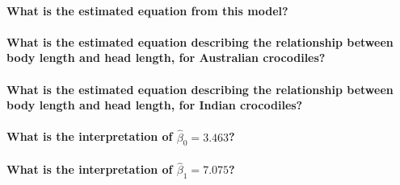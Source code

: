 \documentclass[]{article}
\let\oldparagraph\paragraph
\renewcommand{\paragraph}[1]{\oldparagraph{#1}\mbox{}}
\begin{document}
\newpage

\paragraph{What is the estimated equation from this
model?}\label{what-is-the-estimated-equation-from-this-model}

\vspace{2.5cm}

\paragraph{What is the estimated equation describing the relationship
between body length and head length, for Australian
crocodiles?}\label{what-is-the-estimated-equation-describing-the-relationship-between-body-length-and-head-length-for-australian-crocodiles}

\vspace{2.5cm}

\paragraph{What is the estimated equation describing the relationship
between body length and head length, for Indian
crocodiles?}\label{what-is-the-estimated-equation-describing-the-relationship-between-body-length-and-head-length-for-indian-crocodiles}

\vspace{2.5cm}

\paragraph{\texorpdfstring{What is the interpretation of
\(\widehat{\beta}_0 = 3.463\)?}{What is the interpretation of \textbackslash{}widehat\{\textbackslash{}beta\}\_0 = 3.463?}}\label{what-is-the-interpretation-of-widehatbeta_0-3.463}

\vspace{2.5cm}

\paragraph{\texorpdfstring{What is the interpretation of
\(\widehat{\beta}_1 = 7.075\)?}{What is the interpretation of \textbackslash{}widehat\{\textbackslash{}beta\}\_1 = 7.075?}}\label{what-is-the-interpretation-of-widehatbeta_1-7.075}

\vspace{2.5cm}
\end{document}
